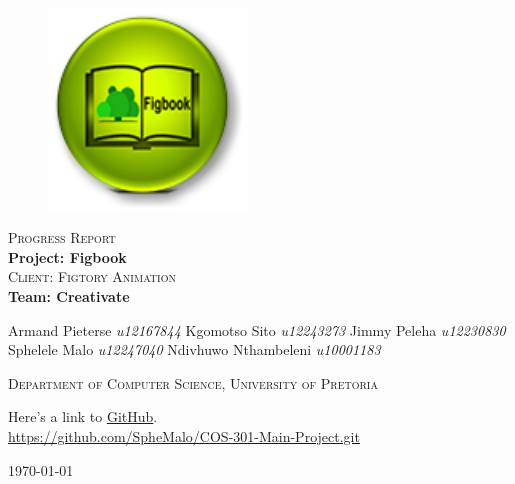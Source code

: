\begin{titlepage}
	\begin{center}
		
		\begin{figure}[t]
			\centering
			\includegraphics[width=200px]{images/figbooklogo-u216.png}
		\end{figure}
		
		\textsc{\Huge Progress Report} \\ 
		\vspace{2cm}
		\textbf{\Huge Project: Figbook} \\ 
		\textsc{\large Client: Figtory Animation} \\ 
		\vspace{2cm}
		\textbf{\Huge Team: Creativate } \\ 
		
		\begin{flushright} \large
			Armand Pieterse \emph{u12167844} \newline
			Kgomotso Sito 		\emph{u12243273} \newline
			Jimmy Peleha		\emph{u12230830} \newline
			Sphelele Malo 	\emph{u12247040} \newline
			Ndivhuwo Nthambeleni 	\emph{u10001183} \newline
			\end{flushright}
		\textsc{\small Department of Computer Science, University of Pretoria}
		
		\vfill
		
	Here's a link to \href{https://github.com/SpheMalo/COS-301-Main-Project.git}{GitHub}.\\
	\url{https://github.com/SpheMalo/COS-301-Main-Project.git}

	\vfill

	{\large \today}	
	
		
		
	\end{center}
\end{titlepage}
